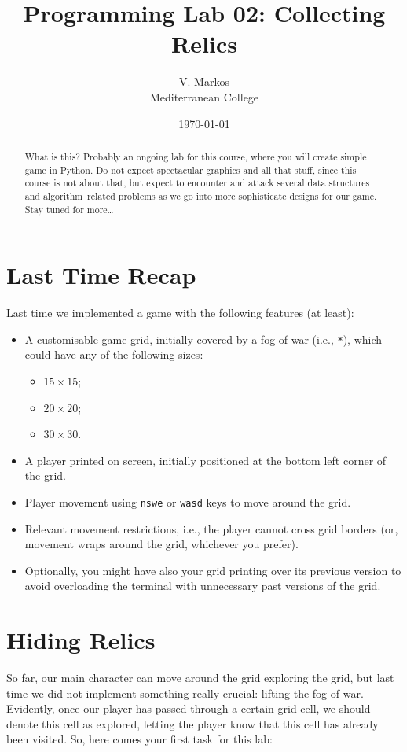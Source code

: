 \documentclass[a4paper, 11pt]{article}
\title{Programming Lab 02: Collecting Relics}
\author{V. Markos\\Mediterranean College}
\date{\today}
\numberwithin{equation}{section}
\theoremstyle{definition}
\newcommand{\fow}{\texttt{*}}
\begin{document}
	\maketitle
	\begin{abstract}
		What is this? Probably an ongoing lab for this course, where you will create simple game in Python. Do not expect spectacular graphics and all that stuff, since this course is not about that, but expect to encounter and attack several data structures and algorithm--related problems as we go into more sophisticate designs for our game. Stay tuned for more\ldots
	\end{abstract}
	\section{Last Time Recap}
	Last time we implemented a game with the following features (at least):
	\begin{itemize}
		\item A customisable game grid, initially covered by a fog of war (i.e., \fow), which could have any of the following sizes:
		\begin{itemize}
			\item $15\times 15$;
			\item $20\times 20$;
			\item $30\times 30$.
		\end{itemize}
		\item A player printed on screen, initially positioned at the bottom left corner of the grid.
		\item Player movement using \texttt{nswe} or \texttt{wasd} keys to move around the grid.
		\item Relevant movement restrictions, i.e., the player cannot cross grid borders (or, movement wraps around the grid, whichever you prefer).
		\item Optionally, you might have also your grid printing over its previous version to avoid overloading the terminal with unnecessary past versions of the grid.
	\end{itemize}
	\section{Hiding Relics}
	So far, our main character can move around the grid exploring the grid, but last time we did not implement something really crucial: lifting the fog of war. Evidently, once our player has passed through a certain grid cell, we should denote this cell as explored, letting the player know that this cell has already been visited. So, here comes your first task for this lab:
	
\end{document}
